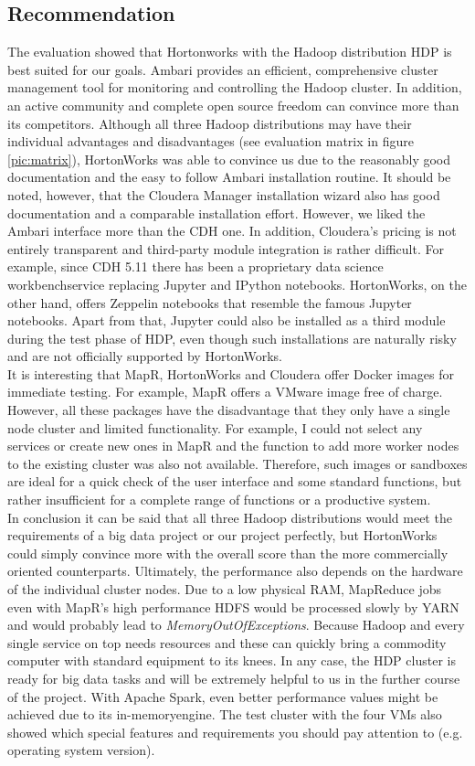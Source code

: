 \subsection{Recommendation}
The evaluation showed that Hortonworks with the Hadoop distribution HDP is best suited for our goals.
Ambari provides an efficient, comprehensive cluster management tool for monitoring and controlling the
Hadoop cluster. In addition, an active community and complete open source freedom can convince more
than its competitors. Although all three Hadoop distributions may have their individual advantages and
disadvantages (see evaluation matrix in figure \ref{pic:matrix}), HortonWorks was able to convince us due to the reasonably good documentation and the easy to follow Ambari installation routine. It should be noted, however, that the Cloudera Manager installation wizard also has good documentation and a comparable installation effort. However, we liked the Ambari interface more than the CDH one. In addition, Cloudera's pricing is not entirely transparent and third-party module integration is rather difficult. For example, since CDH 5.11 there has been a proprietary \glqq data science workbench\grqq service replacing Jupyter and IPython notebooks. HortonWorks, on the other hand, offers Zeppelin notebooks that resemble the famous Jupyter notebooks. Apart from that, Jupyter could also be installed as a third module during the test phase of HDP, even though such installations are naturally risky and are not officially supported by HortonWorks.
\\It is interesting that MapR, HortonWorks and Cloudera offer Docker images for immediate testing. For
example, MapR offers a VMware image free of charge. However, all these packages have the disadvantage
that they only have a single node cluster and limited functionality. For example, I could not select any
services or create new ones in MapR and the function to add more worker nodes to the existing cluster
was also not available. Therefore, such images or sandboxes are ideal for a quick check of the user interface and some standard functions, but rather insufficient for a complete range of functions or a productive system.\\
In conclusion it can be said that all three Hadoop distributions would meet the requirements of a big data
project or our project perfectly, but HortonWorks could simply convince more with the overall score than
the more commercially oriented counterparts. Ultimately, the performance also depends on the hardware
of the individual cluster nodes. Due to a low physical RAM, MapReduce jobs even with MapR's high
performance HDFS would be processed slowly by YARN and would probably lead to
\emph{MemoryOutOfExceptions}. Because Hadoop and every single service on top needs resources and these can
quickly bring a commodity computer with standard equipment to its knees. In any case, the HDP cluster is
ready for big data tasks and will be extremely helpful to us in the further course of the project. With Apache Spark, even better performance values might be achieved due to its \glqq in-memory\grqq engine. The test cluster with the four VMs also showed which special features and requirements you should pay attention to (e.g. operating system version).
